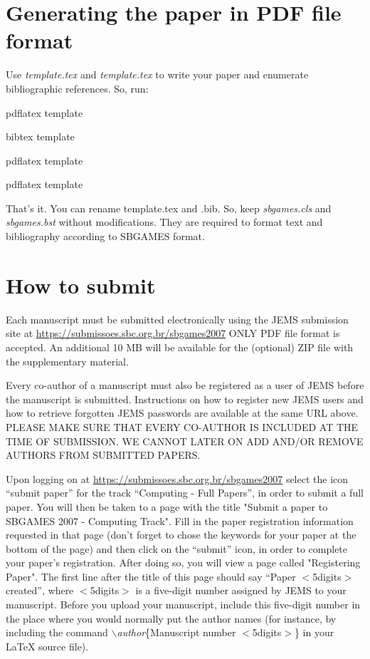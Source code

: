 \documentclass[a4paper]{sbgames}               %
\begin{document}
\section{Generating the paper in PDF file format}
\label{sec:generating-pdf-file}

Use \emph{template.tex} and  \emph{template.tex} to write your paper and enumerate bibliographic references. So, run:

\begin{description}
\item pdflatex template
\item bibtex template
\item pdflatex template
\item pdflatex template
\end{description}

That's it. You can rename template.tex and .bib. So, keep
\emph{sbgames.cls} and \emph{sbgames.bst} without modifications. They
are required to format text and bibliography according to SBGAMES
format.


\section{How to submit}
\label{sec:how-submit}

Each manuscript must be submitted electronically using the JEMS
submission site at \url{https://submissoes.sbc.org.br/sbgames2007} ONLY PDF
file format is accepted. An additional 10 MB will be available for the
(optional) ZIP file with the supplementary material.

Every co-author of a manuscript must also be registered as a user of
JEMS before the manuscript is submitted. Instructions on how to
register new JEMS users and how to retrieve forgotten JEMS passwords
are available at the same URL above. PLEASE MAKE SURE THAT EVERY
CO-AUTHOR IS INCLUDED AT THE TIME OF SUBMISSION. WE CANNOT LATER ON
ADD AND/OR REMOVE AUTHORS FROM SUBMITTED PAPERS.

Upon logging on at \url{https://submissoes.sbc.org.br/sbgames2007}
select the icon ``submit paper'' for the track ``Computing - Full
Papers'', in order to submit a full paper. You will then be taken to a
page with the title "Submit a paper to SBGAMES 2007 - Computing
Track". Fill in the paper registration information requested in that
page (don't forget to chose the keywords for your paper at the bottom
of the page) and then click on the ``submit'' icon, in order to
complete your paper's registration. After doing so, you will view a
page called "Registering Paper". The first line after the title of
this page should say ``Paper $<$5digits$>$ created'', where
$<$5digits$>$ is a five-digit number assigned by JEMS to your
manuscript. Before you upload your manuscript, include this five-digit
number in the place where you would normally put the author names (for
instance, by including the command
$\backslash$\emph{author}\{Manuscript number $<$5digits$>$\} in your
LaTeX source file).
\end{document}
